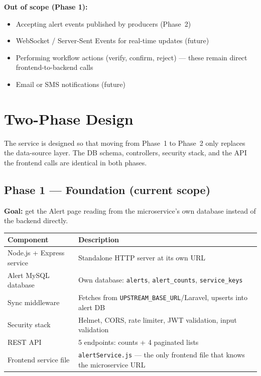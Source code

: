 \documentclass[11pt]{article}
\begin{document}
\textbf{Out of scope (Phase 1):}
\begin{itemize}
  \item Accepting alert events published by producers (Phase~2)
  \item WebSocket / Server-Sent Events for real-time updates (future)
  \item Performing workflow actions (verify, confirm, reject) --- these remain direct
        frontend-to-backend calls
  \item Email or SMS notifications (future)
\end{itemize}

\section{Two-Phase Design}

The service is designed so that moving from Phase~1 to Phase~2 only replaces the data-source
layer. The DB schema, controllers, security stack, and the API the frontend calls are identical
in both phases.

\subsection{Phase 1 --- Foundation (current scope)}

\textbf{Goal:} get the Alert page reading from the microservice's own database instead
of the backend directly.

\begin{table}[h]
\small
\begin{tabularx}{\textwidth}{l X}
\toprule
\textbf{Component} & \textbf{Description} \\
\midrule
Node.js + Express service & Standalone HTTP server at its own URL \\
Alert MySQL database & Own database: \texttt{alerts}, \texttt{alert\_counts}, \texttt{service\_keys} \\
Sync middleware & Fetches from \texttt{UPSTREAM\_BASE\_URL}/Laravel, upserts into alert DB \\
Security stack & Helmet, CORS, rate limiter, JWT validation, input validation \\
REST API & 5 endpoints: counts + 4 paginated lists \\
Frontend service file & \texttt{alertService.js} --- the only frontend file that knows the microservice URL \\
\bottomrule
\end{tabularx}
\end{table}
\end{document}
